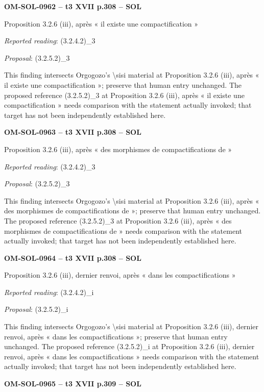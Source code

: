 \par\noindent\textbf{OM-SOL-0962 -- t3 XVII p.308 -- SOL}\par
Proposition 3.2.6 (iii), après « il existe une compactification »\par
\emph{Reported reading}: (3.2.4.2)\_3\par
\emph{Proposal}: (3.2.5.2)\_3\par
This finding intersects Orgogozo's \textbackslash{}sisi material at Proposition 3.2.6 (iii), après « il existe une compactification »; preserve that human entry unchanged. The proposed reference (3.2.5.2)\_3 at Proposition 3.2.6 (iii), après « il existe une compactification » needs comparison with the statement actually invoked; that target has not been independently established here.\par
\par\noindent\textbf{OM-SOL-0963 -- t3 XVII p.308 -- SOL}\par
Proposition 3.2.6 (iii), après « des morphismes de compactifications de »\par
\emph{Reported reading}: (3.2.4.2)\_3\par
\emph{Proposal}: (3.2.5.2)\_3\par
This finding intersects Orgogozo's \textbackslash{}sisi material at Proposition 3.2.6 (iii), après « des morphismes de compactifications de »; preserve that human entry unchanged. The proposed reference (3.2.5.2)\_3 at Proposition 3.2.6 (iii), après « des morphismes de compactifications de » needs comparison with the statement actually invoked; that target has not been independently established here.\par
\par\noindent\textbf{OM-SOL-0964 -- t3 XVII p.308 -- SOL}\par
Proposition 3.2.6 (iii), dernier renvoi, après « dans les compactifications »\par
\emph{Reported reading}: (3.2.4.2)\_i\par
\emph{Proposal}: (3.2.5.2)\_i\par
This finding intersects Orgogozo's \textbackslash{}sisi material at Proposition 3.2.6 (iii), dernier renvoi, après « dans les compactifications »; preserve that human entry unchanged. The proposed reference (3.2.5.2)\_i at Proposition 3.2.6 (iii), dernier renvoi, après « dans les compactifications » needs comparison with the statement actually invoked; that target has not been independently established here.\par
\par\noindent\textbf{OM-SOL-0965 -- t3 XVII p.309 -- SOL}\par
